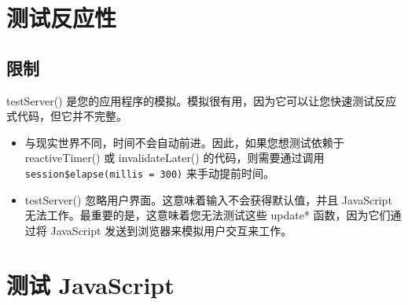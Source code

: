 \section{测试反应性}
\subsection{限制}
testServer() 是您的应用程序的模拟。模拟很有用，因为它可以让您快速测试反应式代码，但它并不完整。
\begin{itemize}
    \item  与现实世界不同，时间不会自动前进。因此，如果您想测试依赖于 reactiveTimer() 或 invalidateLater() 的代码，则需要通过调用 \verb|session$elapse(millis = 300)| 来手动提前时间。

    \item testServer() 忽略用户界面。这意味着输入不会获得默认值，并且 JavaScript 无法工作。最重要的是，这意味着您无法测试这些 update* 函数，因为它们通过将 JavaScript 发送到浏览器来模拟用户交互来工作。
\end{itemize}
\section{测试 JavaScript}

